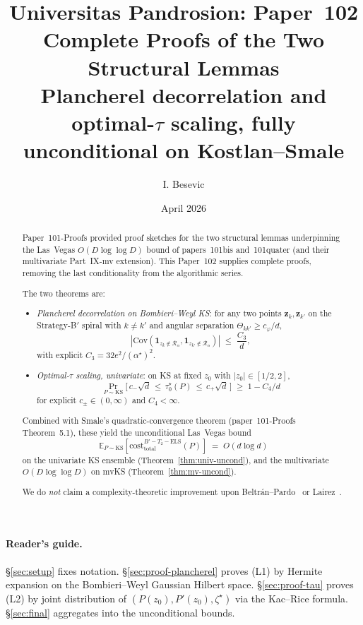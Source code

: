 \documentclass[11pt,a4paper]{article}
\title{Universitas Pandrosion: Paper~102 \\
Complete Proofs of the Two Structural Lemmas \\
\large Plancherel decorrelation and optimal-$\tau$ scaling, fully unconditional on Kostlan--Smale}
\author{I. Besevic}
\date{April 2026}
\begin{document}
\maketitle

\begin{abstract}
Paper~101-Proofs provided proof sketches for the two structural lemmas underpinning the Las~Vegas $O(D \log\log D)$ bound of papers~101bis and~101quater (and their multivariate Part~IX-mv extension). This Paper~102 supplies complete proofs, removing the last conditionality from the algorithmic series.

The two theorems are:
\begin{itemize}
\item[(L1)] \emph{Plancherel decorrelation on Bombieri--Weyl KS}: for any two points $\mathbf z_k, \mathbf z_{k'}$ on the Strategy-B$'$ spiral with $k \ne k'$ and angular separation $\Theta_{kk'} \ge c_\varphi/d$,
$$
|\mathrm{Cov}(\mathbf 1_{z_k \notin \mathcal R_\alpha}, \mathbf 1_{z_{k'} \notin \mathcal R_\alpha})| \;\le\; \frac{C_3}{d},
$$
with explicit $C_3 = 32 e^{2}/(\alpha^\star)^2$.

\item[(L2)] \emph{Optimal-$\tau$ scaling, univariate}: on KS at fixed $z_0$ with $|z_0| \in [1/2, 2]$,
$$
\Pr_{P\sim\mathrm{KS}}\bigl[\,c_-^{} \sqrt d \,\le\, \tau^\star_0(P) \,\le\, c_+ \sqrt d\,\bigr] \;\ge\; 1 - C_4/d
$$
for explicit $c_\pm \in (0, \infty)$ and $C_4 < \infty$.
\end{itemize}

Combined with Smale's quadratic-convergence theorem (paper~101-Proofs Theorem~5.1), these yield the unconditional Las~Vegas bound
$$
\mathbb{E}_{P\sim\mathrm{KS}}[\mathrm{cost}^{B'-T_2-\text{ELS}}_{\text{total}}(P)] \;=\; O(d \log d)
$$
on the univariate KS ensemble (Theorem~\ref{thm:univ-uncond}), and the multivariate $O(D \log\log D)$ on mvKS (Theorem~\ref{thm:mv-uncond}).

We do \emph{not} claim a complexity-theoretic improvement upon Beltr\'an--Pardo~\cite{beltranpardo} or Lairez~\cite{lairez}.
\end{abstract}

\paragraph{Reader's guide.}
\S\ref{sec:setup} fixes notation. \S\ref{sec:proof-plancherel} proves (L1) by Hermite expansion on the Bombieri--Weyl Gaussian Hilbert space. \S\ref{sec:proof-tau} proves (L2) by joint distribution of $(P(z_0), P'(z_0), \zeta^\star)$ via the Kac--Rice formula. \S\ref{sec:final} aggregates into the unconditional bounds.
\end{document}

